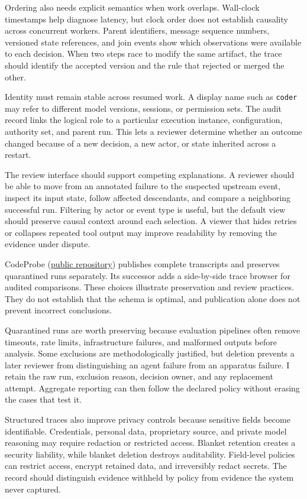 Ordering also needs explicit semantics when work overlaps. Wall-clock timestamps help diagnose latency, but clock order does not establish causality across concurrent workers. Parent identifiers, message sequence numbers, versioned state references, and join events show which observations were available to each decision. When two steps race to modify the same artifact, the trace should identify the accepted version and the rule that rejected or merged the other.

Identity must remain stable across resumed work. A display name such as \texttt{coder} may refer to different model versions, sessions, or permission sets. The audit record links the logical role to a particular execution instance, configuration, authority set, and parent run. This lets a reviewer determine whether an outcome changed because of a new decision, a new actor, or state inherited across a restart.

The review interface should support competing explanations. A reviewer should be able to move from an annotated failure to the suspected upstream event, inspect its input state, follow affected descendants, and compare a neighboring successful run. Filtering by actor or event type is useful, but the default view should preserve causal context around each selection. A viewer that hides retries or collapses repeated tool output may improve readability by removing the evidence under dispute.

CodeProbe (\href{https://github.com/sjarmak/codeprobe}{public repository}) publishes complete transcripts and preserves quarantined runs separately. Its successor adds a side-by-side trace browser for audited comparisons. These choices illustrate preservation and review practices. They do not establish that the schema is optimal, and publication alone does not prevent incorrect conclusions.

Quarantined runs are worth preserving because evaluation pipelines often remove timeouts, rate limits, infrastructure failures, and malformed outputs before analysis. Some exclusions are methodologically justified, but deletion prevents a later reviewer from distinguishing an agent failure from an apparatus failure. I retain the raw run, exclusion reason, decision owner, and any replacement attempt. Aggregate reporting can then follow the declared policy without erasing the cases that test it.

Structured traces also improve privacy controls because sensitive fields become identifiable. Credentials, personal data, proprietary source, and private model reasoning may require redaction or restricted access. Blanket retention creates a security liability, while blanket deletion destroys auditability. Field-level policies can restrict access, encrypt retained data, and irreversibly redact secrets. The record should distinguish evidence withheld by policy from evidence the system never captured.

